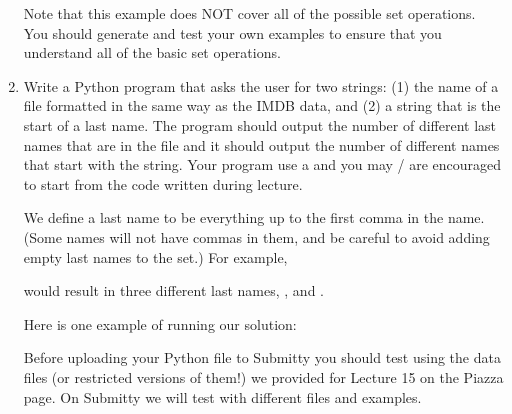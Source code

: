 \documentclass[letterpaper,10pt,english]{sphinxmanual}
\begin{document}
\begin{enumerate}
Note that this example does NOT cover all of the possible set
operations. You should generate and test your own examples to ensure
that you understand all of the basic set operations.

\item {} 
Write a Python program that asks the user for two strings:  (1) the
name of a file formatted in the same way as the IMDB data, and (2)
a string that is the start of a last name.  The program should
output the number of different last names that are in the file and
it should output the number of different names that start with the
string.  Your program  use a  and you may / are
encouraged to start from
the code written during lecture.

We define a last name to be everything up to the first comma in the
name.  (Some names will not have commas in them, and be careful to
avoid adding empty last names to the set.)   For example,

%
\begin{sphinxVerbatim}[commandchars=\\\{\}]
             
           
               
\end{sphinxVerbatim}

would result in three different last names, ,
 and .

Here is one example of running our solution:

%
\begin{sphinxVerbatim}[commandchars=\\\{\}]
   
 
  
   
\end{sphinxVerbatim}

Before uploading your Python file to Submitty you should test using
the data files (or restricted versions of them!)  we provided for
Lecture 15 on the Piazza page.  On Submitty we will test with
different files and examples.

\end{enumerate}
\end{document}
